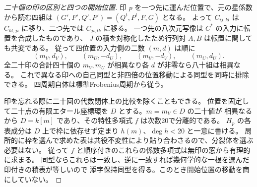 \begin{proof}[二十個の印の区別と四つの開始位置]
印 $p$ を一つ先に運んだ位置で、元の星係数から読む四組は
$(G',F',Q',P')=(Q^t,P^t,F,G)$ となる。
よって $C_{ij,kl}$ は $C_{kl,ji}$ に移り、二つ先では $C_{ji,lk}$ に移る。
一つ先の八次元写像は $C^*$ の入力に転置を合成したものであり、
$J$ の積を対称化したため行列対 $A,B$ は転置に関しても共変である。
従って四位置の入力側の二数 $(m,d)$ は順に
\[
 (m_V,d_V),\qquad (m_U,-d_U),\qquad (m_V,-d_V),\qquad (m_U,d_U).
\]
全二十印の合計四十個の $m_V,m_U$ が相異なり各 $d$ が非零なら八十組は相異なる。
これで異なる印への自己同型と非四倍の位置移動による同型を同時に排除できる。
四周期自体は標準Frobenius周期から従う。

印を忘れる際に二十回の代数閉体上の比較を除くこともできる。
位置を固定して二十点の有限エタール座標環を $D$ とする。$m=m_V\in D$ の二十値が
相異なるから $D=k[m]$ であり、その特性多項式 $f$ は次数20で分離的である。
$H_p$ の各表成分は $D$ 上で枠に依存せず定まり $h(m)$、$\deg h<20$ と一意に書ける。
局所的に枠を選んで求めた表は共役不変性により貼り合わさるので、分裂体を選ぶ必要はない。
従って $f$ と順序付きのこれらの係数多項式は無印の窓から有理的に求まる。
同型ならこれらは一致し、逆に一致すれば幾何学的な一根を選んだ印付きの積表が等しいので
添字保持同型を得る。このとき開始位置の移動を商にしていない。
\end{proof}

